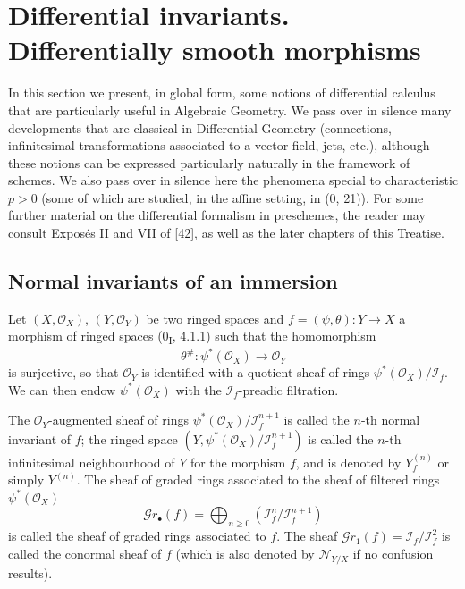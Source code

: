 \section{Differential invariants. Differentially smooth morphisms}
\label{section:IV.16}

In this section we present, in global form, some notions of
differential calculus that are particularly useful in Algebraic Geometry. We pass
over in silence many developments that are classical in Differential Geometry (connections,
infinitesimal transformations associated to a vector field, jets, etc.), although these
notions can be expressed particularly naturally in the framework of schemes. We
also pass over in silence here the phenomena special to characteristic $p>0$
(some of which are studied, in the affine setting, in (0, 21)). For some further
material on the differential formalism in preschemes, the reader may consult
Exposés II and VII of [42], as well as the later chapters of this Treatise.

\subsection{Normal invariants of an immersion}

\begin{env}[16.1.1]
\label{IV.16.1.1}
Let $(X,\mathcal{O}_X)$, $(Y,\mathcal{O}_Y)$ be two ringed spaces and
$f=(\psi,\theta):Y\to X$ a morphism of ringed spaces (0\textsubscript{I}, 4.1.1)
such that the homomorphism
\[
  \theta^\#:\psi^*(\mathcal{O}_X)\longrightarrow\mathcal{O}_Y
\]
is surjective, so that $\mathcal{O}_Y$ is identified with a quotient sheaf of rings
$\psi^*(\mathcal{O}_X)/\mathscr{I}_f$. We can then endow
$\psi^*(\mathcal{O}_X)$ with the $\mathscr{I}_f$-preadic filtration.
\end{env}

\begin{definition}[16.1.2]\label{IV.16.1.2}
The $\mathcal{O}_Y$-augmented sheaf of rings
$\psi^*(\mathcal{O}_X)/\mathscr{I}_f^{n+1}$ is called the $n$-th normal invariant
of $f$; the ringed space
$(Y,\psi^*(\mathcal{O}_X)/\mathscr{I}_f^{n+1})$ is called the $n$-th infinitesimal
neighbourhood of $Y$ for the morphism $f$, and is denoted by $Y_f^{(n)}$ or simply
$Y^{(n)}$. The sheaf of graded rings associated to the sheaf of filtered rings
$\psi^*(\mathcal{O}_X)$
\[
  \mathscr{G}r_\bullet(f)=\bigoplus_{n\geq 0}
  (\mathscr{I}_f^n/\mathscr{I}_f^{n+1})
  \tag{16.1.2.1}
  \label{IV.16.1.2.1}
\]
is called the sheaf of graded rings associated to $f$. The sheaf
$\mathscr{G}r_1(f)=\mathscr{I}_f/\mathscr{I}_f^2$ is called the conormal sheaf
of $f$ (which is also denoted by $\mathscr{N}_{Y/X}$ if no confusion results).
\end{definition}

